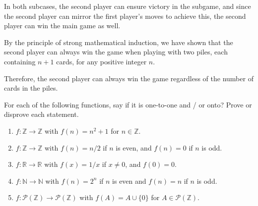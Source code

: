 \documentclass{article}
\newcommand{\Z}{\mathbb{Z}}
\newcommand{\N}{\mathbb{N}}
\newcommand{\R}{\mathbb{R}}
\theoremstyle{definition}
\begin{document}
\begin{solution}
\begin{enumerate}
\end{enumerate}

In both subcases, the second player can ensure victory in the subgame, and since the second player can mirror the first player's moves to achieve this, the second player can win the main game as well.

By the principle of strong mathematical induction, we have shown that the second player can always win the game when playing with two piles, each containing $n + 1$ cards, for any positive integer $n$.

Therefore, the second player can always win the game regardless of the number of cards in the piles.
\end{solution}



\begin{question}
    For each of the following functions, say if it is one-to-one and / or onto? Prove or disprove each statement.
    \begin{enumerate}
	\item $f : \Z \to \Z$ with $f(n) = n^2 + 1$ for $n \in \Z$.
	\item $f : \Z \to \Z$ with $f(n) = n/2$ if $n$ is even, and $f(n) = 0$ if $n$ is odd.
	\item $f : \R \to \R$ with $f(x) = 1/x$ if $x \neq 0$, and $f(0) = 0$.
	\item $f: \N \to \N$ with $f(n) = 2^n$ if $n$ is even and $f(n) = n$ if $n$ is odd.
	\item $f : \mathcal{P}(\Z) \to \mathcal{P}(\Z)$ with $f(A) = A \cup \{ 0 \}$ for $A \in \mathcal{P}(\Z)$.
    \end{enumerate}
\end{question}
\end{document}
